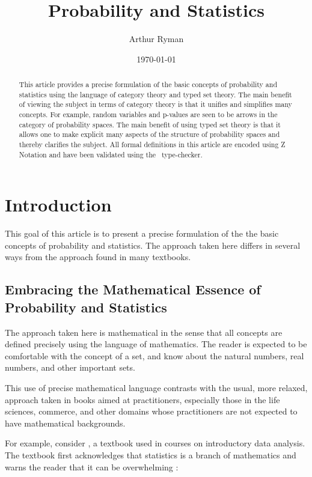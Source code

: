 \documentclass{article}
\title{Probability and Statistics}
\author{Arthur Ryman}
\date{\today}
\begin{document}


\maketitle

\begin{abstract}
This article provides a precise formulation of the basic concepts of probability and statistics
using the language of category theory and typed set theory.
The main benefit of viewing the subject in terms of category theory is that it unifies and simplifies many concepts.
For example, random variables and p-values are seen to be arrows in the category of probability spaces.
The main benefit of using typed set theory is that it allows one to make explicit many aspects of the structure of probability spaces and thereby clarifies the subject.
All formal definitions in this article are encoded using Z Notation and have been validated using the \fuzz\ type-checker.
\end{abstract}

\section{Introduction}

This goal of this article is to present a precise formulation of the the basic concepts of probability and statistics.
The approach taken here differs in several ways from the approach found in many textbooks.

\subsection{Embracing the Mathematical Essence of Probability and Statistics}

The approach taken here is mathematical in the sense that all concepts are defined precisely using the language of mathematics.
The reader is expected to be comfortable with the concept of a set, and know about the natural numbers, real numbers, and other important sets.

This use of precise mathematical language contrasts with the usual, more relaxed, approach taken in books aimed at practitioners, 
especially those in the life sciences, commerce, and other domains whose practitioners are not expected to have mathematical backgrounds.

For example, consider \cite{mendenhall:ips14}, a textbook used in courses on introductory data analysis.
The textbook first acknowledges that statistics is a branch of mathematics and warns the reader that it can be overwhelming
\cite[p3]{mendenhall:ips14}:
\end{document}
